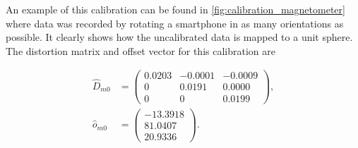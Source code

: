 An example of this calibration can be found in \cref{fig:calibration_magnetometer} where data was recorded by rotating a smartphone in as many orientations as possible. It clearly shows how the uncalibrated data is mapped to a unit sphere. The distortion matrix and offset vector for this calibration are 

\begin{subequations}
	\begin{align}
		\widehat{D}_{m0} &= \left(\begin{array}{rrr}
			0.0203 & -0.0001 & -0.0009 \\
			0 & 0.0191 & 0.0000 \\
			0 & 0 & 0.0199
		\end{array}\right), \\
		\widehat{o}_{m0} &= \left(\begin{array}{r}
			-13.3918 \\
			81.0407 \\
			20.9336
		\end{array}\right).
	\end{align}
	
\end{subequations}

